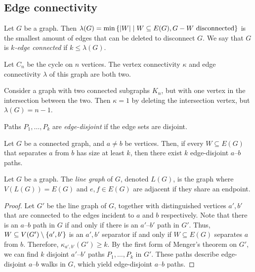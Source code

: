 \subsection{Edge connectivity}
\begin{definition}
	Let \( G \) be a graph.
	Then \( \lambda(G) = \min\qty{\abs{W} \mid W \subseteq E(G), G - W \text{ disconnected}} \) is the smallest amount of edges that can be deleted to disconnect \( G \).
	We say that \( G \) is \emph{\( k \)-edge connected} if \( k \leq \lambda(G) \).
\end{definition}
\begin{example}
	Let \( C_n \) be the cycle on \( n \) vertices.
	The vertex connectivity \( \kappa \) and edge connectivity \( \lambda \) of this graph are both two.
\end{example}
\begin{example}
	Consider a graph with two connected subgraphs \( K_n \), but with one vertex in the intersection between the two.
	Then \( \kappa = 1 \) by deleting the intersection vertex, but \( \lambda(G) = n - 1 \).
\end{example}
\begin{definition}
	Paths \( P_1, \dots, P_k \) are \emph{edge-disjoint} if the edge sets are disjoint.
\end{definition}
\begin{theorem}
	Let \( G \) be a connected graph, and \( a \neq b \) be vertices.
	Then, if every \( W \subseteq E(G) \) that separates \( a \) from \( b \) has size at least \( k \), then there exist \( k \) edge-disjoint \( a \)--\( b \) paths.
\end{theorem}
\begin{definition}
	Let \( G \) be a graph.
	The \emph{line graph} of \( G \), denoted \( L(G) \), is the graph where \( V(L(G)) = E(G) \) and \( e,f \in E(G) \) are adjacent if they share an endpoint.
\end{definition}
\begin{proof}
	Let \( G' \) be the line graph of \( G \), together with distinguished vertices \( a', b' \) that are connected to the edges incident to \( a \) and \( b \) respectively.
	Note that there is an \( a \)--\( b \) path in \( G \) if and only if there is an \( a' \)--\( b' \) path in \( G' \).
	Thus, \( W \subseteq V(G') \setminus \qty{a',b'} \) is an \( a',b' \) separator if and only if \( W \subseteq E(G) \) separates \( a \) from \( b \).
	Therefore, \( \kappa_{a',b'}(G') \geq k \).
	By the first form of Menger's theorem on \( G' \), we can find \( k \) disjoint \( a' \)--\( b' \) paths \( P_1, \dots, P_k \) in \( G' \).
	These paths describe edge-disjoint \( a \)--\( b \) walks in \( G \), which yield edge-disjoint \( a \)--\( b \) paths.
\end{proof}
